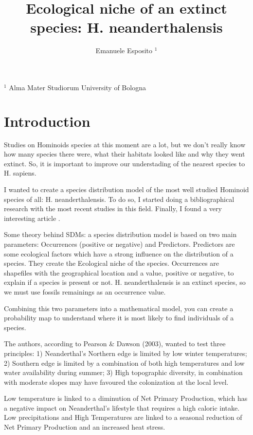 \documentclass[a4paper,12pt]{article}
\title{Ecological niche of an extinct species: H. neanderthalensis}
\author{Emanuele Esposito $^1$}
\begin{document}
\maketitle

$^1$ Alma Mater Studiorum University of Bologna

\tableofcontents

\section{Introduction}
	Studies on Hominoids species at this moment are a lot, but we don't really know how many species there were, what their habitats looked like and why they went extinct.
	So, it is important to improve our understading of the nearest species to H. sapiens.

	I wanted to create a species distribution model of the most well studied Hominoid species of all: H. neanderthalensis.
	To do so, I started doing a bibliographical research with the most recent studies in this field. 
	Finally, I found a very interesting article \citep{benito}.

	Some theory behind SDMs: a species distribution model is based on two main parameters: Occurrences (positive or negative) and Predictors.
	Predictors are some ecological factors which have a strong influence on the distribution of a species. They create the Ecological niche of the species.
	Occurrences are shapefiles with the geographical location and a value, positive or negative, to explain if a species is present or not.
	H. neanderthalensis is an extinct species, so we must use fossils remainings as an occurrence value.

	Combining this two parameters into a mathematical model, you can create a probability map to understand where it is most likely to find individuals of a species.
	
	The authors, according to Pearson & Dawson (2003), wanted to test three principles:
	1) Neanderthal's Northern edge is limited by low winter temperatures;
	2) Southern edge is limited by a combination of both high temperatures and low water availability during summer;
	3) High topographic diversity, in combination with moderate slopes may have favoured the colonization at the local level.
	
	Low temperature is linked to a diminution of Net Primary Production, which has a negative impact on Neanderthal's lifestyle that requires a high caloric intake. Low precipitations and High Temperatures are linked to a seasonal reduction of Net Primary Production and an increased heat stress. 
	
\end{document}

